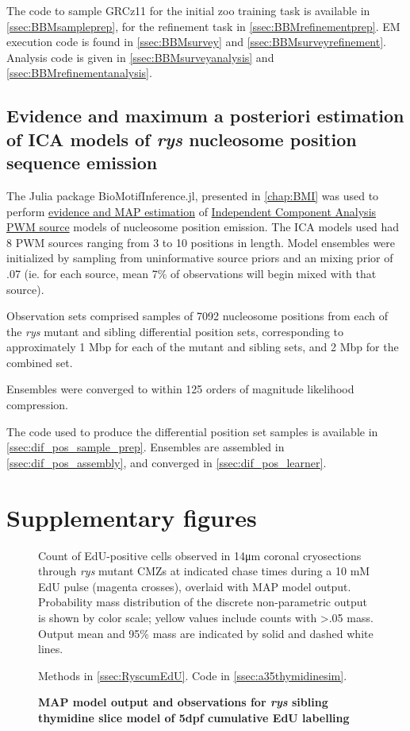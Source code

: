 The code to sample GRCz11 for the initial zoo training task is available in \autoref{ssec:BBMsampleprep}, for the refinement task in \autoref{ssec:BBMrefinementprep}. EM execution code is found in \autoref{ssec:BBMsurvey} and \autoref{ssec:BBMsurveyrefinement}. Analysis code is given in \autoref{ssec:BBMsurveyanalysis} and \autoref{ssec:BBMrefinementanalysis}.

\subsection{Evidence and maximum a posteriori estimation of ICA models of \textit{rys} nucleosome position sequence emission}
\label{ssec:rysBMI}
The Julia package BioMotifInference.jl, presented in \autoref{chap:BMI} was used to perform \hyperref[ssec:BayesEpistemology]{evidence and MAP estimation} of \hyperref[ssec:ICA]{Independent Component Analysis} \hyperref[ssec:PWM]{PWM source} models of nucleosome position emission. The ICA models used had 8 PWM sources ranging from 3 to 10 positions in length. Model ensembles were initialized by sampling from uninformative source priors and an mixing prior of .07 (ie. for each source, mean 7\% of observations will begin mixed with that source).

Observation sets comprised samples of 7092 nucleosome positions from each of the \textit{rys} mutant and sibling differential position sets, corresponding to approximately 1 Mbp for each of the mutant and sibling sets, and 2 Mbp for the combined set.

Ensembles were converged to within 125 orders of magnitude likelihood compression. 

The code used to produce the differential position set samples is available in \autoref{ssec:dif_pos_sample_prep}. Ensembles are assembled in \autoref{ssec:dif_pos_assembly}, and converged in \autoref{ssec:dif_pos_learner}.

\section{Supplementary figures}

\begin{figure}[!h]
    \caption{{\bf  MAP model output and observations for \textit{rys} sibling thymidine slice model of 5dpf cumulative EdU labelling}}
    Count of EdU-positive cells observed in 14\si{\micro\metre} coronal cryosections through \textit{rys} mutant CMZs at indicated chase times during a 10 mM EdU pulse (magenta crosses), overlaid with MAP model output. Probability mass distribution of the discrete non-parametric output is shown by color scale; yellow values include counts with >.05 mass. Output mean and 95\% mass are indicated by solid and dashed white lines.

    Methods in \autoref{ssec:RyscumEdU}. Code in \autoref{ssec:a35thymidinesim}.
    \label{a35sibMAP}
\end{figure}


